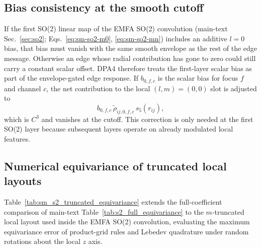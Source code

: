 \subsection{Bias consistency at the smooth cutoff}
\label{sec:sm-so2conv}

If the first SO(2) linear map of the EMFA SO(2) convolution (main-text Sec.~\ref{sec:so2}; Eqs.~\eqref{eq:sm-so2-m0}, \eqref{eq:sm-so2-mn}) includes an additive $l=0$ bias, that bias must vanish with the same smooth envelope as the rest of the edge message.
Otherwise an edge whose radial contribution has gone to zero could still carry a constant scalar offset.
DPA4 therefore treats the first-layer scalar bias as part of the envelope-gated edge response.
If $b_{0,f,c}$ is the scalar bias for focus $f$
and channel $c$, the net contribution to the local $(l,m)=(0,0)$ slot is
adjusted to
\begin{equation}
    b_{0,f,c}\,\widetilde{\rho}_{ij,0,f,c}\,s_5(r_{ij}),
    \label{eq:sm-bias-consistency}
\end{equation}
which is $C^3$ and vanishes at the cutoff.
This correction is only needed at the first SO(2) layer because subsequent layers operate on already modulated local features.

\subsection{Numerical equivariance of truncated local layouts}
\label{sec:sm-truncated-equivariance}

Table~\ref{tab:sm_s2_truncated_equivariance} extends the full-coefficient comparison of main-text Table~\ref{tab:s2_full_equivariance} to the $m$-truncated local layout used inside the EMFA SO(2) convolution, evaluating the maximum equivariance error of product-grid rules and Lebedev quadrature under random rotations about the local $z$ axis.

